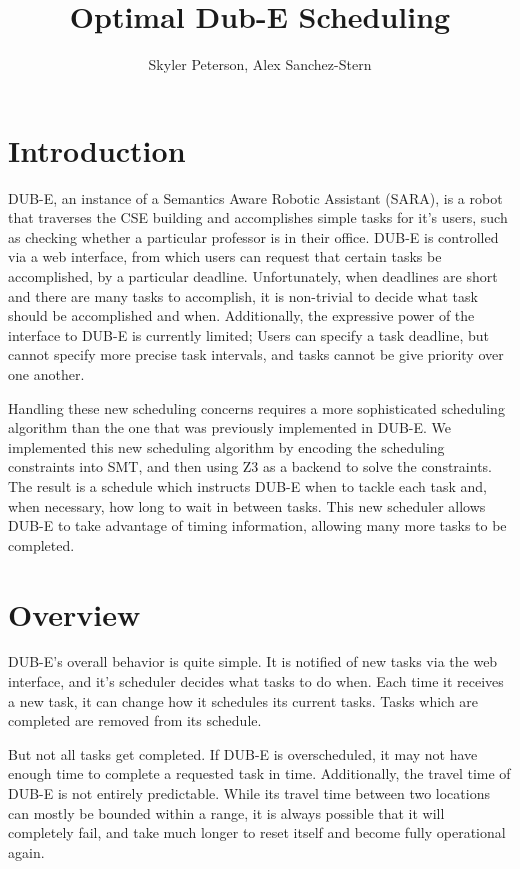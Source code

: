 \documentclass[11pt]{article}
\title{Optimal Dub-E Scheduling}
\author{Skyler Peterson, Alex Sanchez-Stern}
\begin{document}
\maketitle
\section{Introduction}
DUB-E, an instance of a Semantics Aware Robotic Assistant (SARA),
is a robot that traverses the CSE building
and accomplishes simple tasks for it's users,
such as checking whether a particular professor is in their office.
DUB-E is controlled via a web interface,
from which users can request that certain tasks be accomplished,
by a particular deadline.
Unfortunately, when deadlines are short
and there are many tasks to accomplish,
it is non-trivial to decide what task
should be accomplished and when.
Additionally, the expressive power of the interface to DUB-E
is currently limited;
Users can specify a task deadline,
but cannot specify more precise task intervals,
and tasks cannot be give priority over one another.

Handling these new scheduling concerns
requires a more sophisticated scheduling algorithm
than the one that was previously implemented in DUB-E.
We implemented this new scheduling algorithm
by encoding the scheduling constraints into SMT,
and then using Z3 as a backend
to solve the constraints.
The result is a schedule which instructs DUB-E
when to tackle each task and,
when necessary,
how long to wait in between tasks.
This new scheduler allows DUB-E
to take advantage of timing information,
allowing many more tasks to be completed.

\section{Overview}
DUB-E's overall behavior is quite simple.
It is notified of new tasks via the web interface,
and it's scheduler decides what tasks to do when.
Each time it receives a new task,
it can change how it schedules its current tasks.
Tasks which are completed are removed from its schedule.

But not all tasks get completed.
If DUB-E is overscheduled,
it may not have enough time to complete a requested task in time.
Additionally, the travel time of DUB-E
is not entirely predictable.
While its travel time between two locations
can mostly be bounded within a range,
it is always possible that it will completely fail,
and take much longer to reset itself
and become fully operational again.
\end{document}
